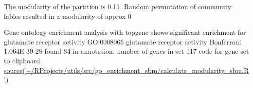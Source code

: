 The modularity of the partition is 0.11. Random permutation of community lables resulted in a modularity of approx 0 

Gene ontology enrichment analysis with topgene shows significant enrichment for glutamate receptor activity GO:0008066	glutamate receptor activity		Bonferroni	1.064E-39	28 found	84 in annotation.  number of genes in set 117 code for gene set to clipboard \url{source('~/RProjects/utils/src/go_enrichment_sbm/calculate_modularity_sbm.R')}


